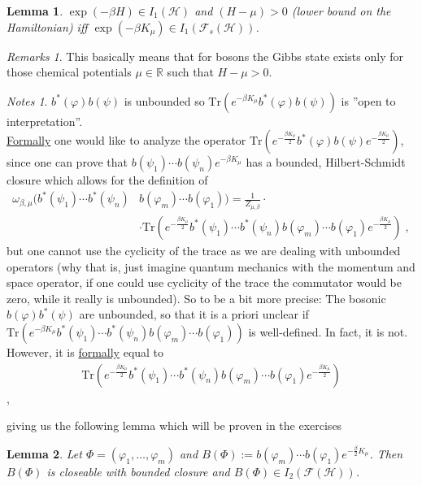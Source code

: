 \documentclass[
a4paper, %
11pt, %
onecolumn, %
openany, %
]{memoir}
\theoremstyle{definition}
\theoremstyle{remark}
\newtheorem{remarks}{Remarks}[chapter]
\newtheorem{notes}{Notes}[chapter]
\theoremstyle{plain}
\newtheorem{lemma}{Lemma}[chapter]
\begin{document}
\begin{lemma}
	$\exp(-\beta H)\in I_1(\mathcal{H})$ and $(H-\mu)>0$ (lower bound on the Hamiltonian) iff $\exp(-\beta K_{\mu})\in I_1(\mathcal{F}_s(\mathcal{H}))$.
\end{lemma}
\begin{remarks}
This basically means that for bosons the Gibbs state exists only for those chemical potentials $\mu\in\mathbb{R}$ such that $H-\mu>0$.
\end{remarks}
\begin{notes}
	$b^*(\varphi)b(\psi)$ is unbounded so $\mathrm{Tr}(e^{-\beta K_{\mu}}b^*(\varphi)b(\psi))$ is ''open to interpretation''.\\
	\underline{Formally} one would like to analyze the operator $\mathrm{Tr}\left( e^{-\frac{\beta K_{\mu}}{2}}b^*(\varphi)b(\psi)e^{-\frac{\beta K_{\mu}}{2}}\right)$, since one can prove that $b(\psi_1)\cdots b(\psi_n)e^{-\beta K_{\mu}}$ has a bounded, Hilbert-Schmidt closure which allows for the definition of \begin{align}
		\omega_{\beta,\mu}(b^*(\psi_1)\cdots b^*(\psi_n)&b(\varphi_m)\cdots b(\varphi_1))=\frac{1}{Z_{\mu,\beta}}\cdot \\ &\cdot \mathrm{Tr}\left(e^{-\frac{\beta K_{\mu}}{2}}b^*(\psi_1)\cdots b^*(\psi_n)b(\varphi_m)\cdots b(\varphi_1)e^{-\frac{\beta K_{\mu}}{2}}\right)\; ,
	\end{align}
	but one cannot use the cyclicity of the trace as we are dealing with unbounded operators (why that is, just imagine quantum mechanics with the momentum and space operator, if one could use cyclicity of the trace the commutator would be zero, while it really is unbounded). So to be a bit more precise: The bosonic $b(\varphi)b^*(\psi)$ are unbounded, so that it is a priori unclear if $\mathrm{Tr}(e^{-\beta K_{\mu}}b^*(\psi_1)\cdots b^*(\psi_n)b(\varphi_m)\cdots b(\varphi_1))$ is well-defined. In fact, it is not. However, it is \underline{formally} equal to \begin{align}\mathrm{Tr}\left(e^{-\frac{\beta K_{\mu}}{2}}b^*(\psi_1)\cdots b^*(\psi_n)b(\varphi_m)\cdots b(\varphi_1)e^{-\frac{\beta K_{\mu}}{2}}\right)\end{align}\; ,
\end{notes}
giving us the following lemma which will be proven in the exercises \begin{lemma}
Let $\Phi=(\varphi_1,\ldots,\varphi_m)$ and $B(\Phi):=b(\varphi_m)\cdots b(\varphi_1)e^{-\frac{\beta}{2}K_{\mu}}$. Then $B(\Phi)$ is closeable with bounded closure and $B(\Phi)\in I_2(\mathcal{F}(\mathcal{H}))$.\end{lemma}
\end{document}
